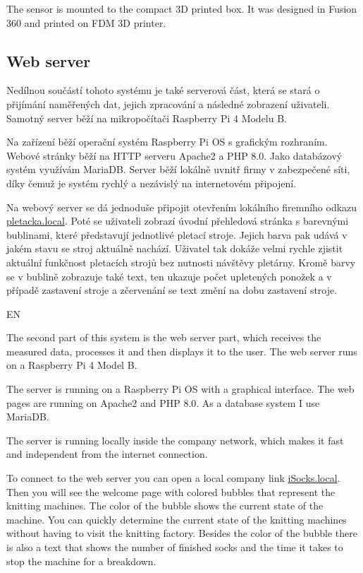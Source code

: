 \documentclass[12pt, a4paper]{article}
\begin{document}
The sensor is mounted to the compact 3D printed box.
It was designed in Fusion 360 and printed on FDM 3D printer.

\subsection*{Web server}

Nedílnou součástí tohoto systému je také serverová část, která se stará o přijímání naměřených dat, jejich zpracování a následné zobrazení uživateli.
Samotný server běží na mikropočítači Raspberry Pi 4 Modelu B.

Na zařízení běží operační systém Raspberry Pi OS s grafickým rozhraním.
Webové stránky běží na HTTP serveru Apache2 a PHP 8.0.
Jako databázový systém využívám MariaDB.
Server běží lokálně uvnitř firmy v zabezpečené síti, díky čemuž je systém rychlý a nezávislý na internetovém připojení.

Na webový server se dá jednoduše připojit otevřením lokálního firemního odkazu \newline\href{http://pletacka.local}{pletacka.local}.
Poté se uživateli zobrazí úvodní přehledová stránka s barevnými bublinami, které představují jednotlivé pletací stroje.
Jejich barva pak udává v jakém stavu se stroj aktuálně nachází. Uživatel tak dokáže velmi rychle zjistit aktuální funkčnost pletacích strojů bez nutnosti návštěvy pletárny.
Kromě barvy se v bublině zobrazuje také text, ten ukazuje počet upletených ponožek a v případě zastavení stroje a zčervenání se text změní na dobu zastavení stroje.

EN

The second part of this system is the web server part, which receives the measured data, processes it and then displays it to the user.
The web server runs on a Raspberry Pi 4 Model B.

The server is running on a Raspberry Pi OS with a graphical interface.
The web pages are running on Apache2 and PHP 8.0.
As a database system I use MariaDB.

The server is running locally inside the company network, which makes it fast and independent from the internet connection.

To connect to the web server you can open a local company link \newline\href{http://iSocks.local}{iSocks.local}.
Then you will see the welcome page with colored bubbles that represent the knitting machines.
The color of the bubble shows the current state of the machine.
You can quickly determine the current state of the knitting machines without having to visit the knitting factory.
Besides the color of the bubble there is also a text that shows the number of finished socks and the time it takes to stop the machine for a breakdown.
\end{document}
